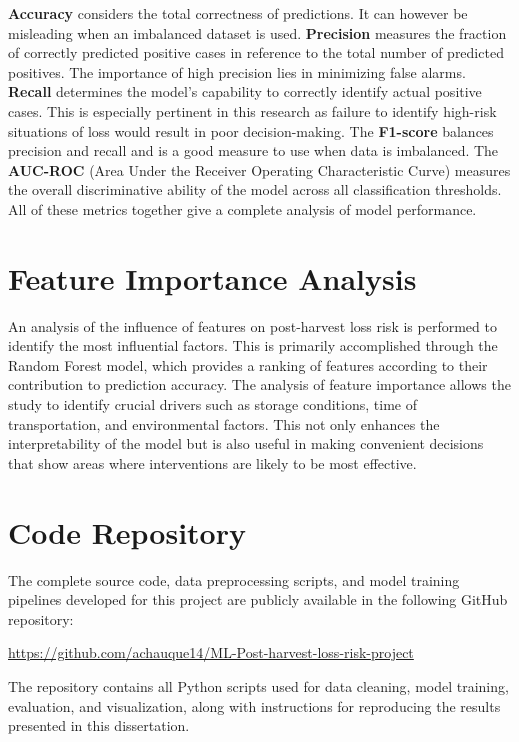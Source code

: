 \textbf{Accuracy} considers the total correctness of predictions. It can however be misleading when
an imbalanced dataset is used. \textbf{Precision} measures the fraction of correctly predicted
positive cases in reference to the total number of predicted positives. The importance of high
precision lies in minimizing false alarms. \textbf{Recall} determines the model's capability to
correctly identify actual positive cases. This is especially pertinent in this research as failure
to identify high-risk situations of loss would result in poor decision-making. The \textbf{F1-score}
balances precision and recall and is a good measure to use when data is imbalanced. The
\textbf{AUC-ROC} (Area Under the Receiver Operating Characteristic Curve) measures the overall
discriminative ability of the model across all classification thresholds. All of these metrics
together give a complete analysis of model performance.


\section{Feature Importance Analysis}

An analysis of the influence of features on post-harvest loss risk is performed to identify the most
influential factors. This is primarily accomplished through the Random Forest model, which provides
a ranking of features according to their contribution to prediction accuracy. The analysis of
feature importance allows the study to identify crucial drivers such as storage conditions, time of
transportation, and environmental factors. This not only enhances the interpretability of the model
but is also useful in making convenient decisions that show areas where interventions are likely to
be most effective.

\section{Code Repository}

The complete source code, data preprocessing scripts, and model training pipelines developed
for this project are publicly available in the following GitHub repository:

\begin{center}
    \url{https://github.com/achauque14/ML-Post-harvest-loss-risk-project}
\end{center}

The repository contains all Python scripts used for data cleaning, model training, evaluation,
and visualization, along with instructions for reproducing the results presented in this
dissertation.


